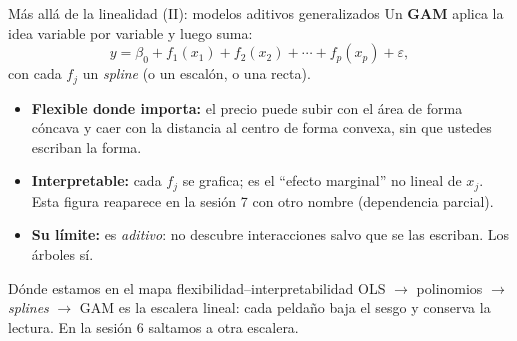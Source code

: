 \documentclass{beamer}
\newcommand{\1}{\mathbb{I}}
\begin{document}
\begin{frame}{Más allá de la linealidad (II): modelos aditivos generalizados}
\small
Un \textbf{GAM} aplica la idea variable por variable y luego suma:
\[ y = \beta_0 + f_1(x_1) + f_2(x_2) + \cdots + f_p(x_p) + \varepsilon, \]
con cada $f_j$ un \emph{spline} (o un escalón, o una recta).
\pause
\vspace{0.15cm}
\begin{itemize}\itemsep4pt
  \item \textbf{Flexible donde importa:} el precio puede subir con el área de forma cóncava y caer con la distancia al centro de forma convexa, sin que ustedes escriban la forma.
  \item \textbf{Interpretable:} cada $f_j$ se grafica; es el ``efecto marginal'' no lineal de $x_j$. Esta figura reaparece en la sesión 7 con otro nombre (dependencia parcial).
  \item \textbf{Su límite:} es \emph{aditivo}: no descubre interacciones salvo que se las escriban. Los árboles sí. \pause
\end{itemize}
\begin{block}{Dónde estamos en el mapa flexibilidad--interpretabilidad}
OLS $\rightarrow$ polinomios $\rightarrow$ \emph{splines} $\rightarrow$ GAM es la escalera lineal: cada peldaño baja el sesgo y conserva la lectura. En la sesión 6 saltamos a otra escalera.
\end{block}
\end{frame}
\end{document}
